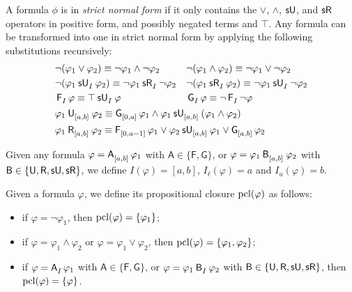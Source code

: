 \documentclass[acmsmall,screen]{acmart}
\begin{document}
A formula $\phi$ is in \emph{strict normal form} if it only contains
the $\lor$, $\land$, $\suntilop$, and $\sreleaseop$ operators in positive form,
and possibly negated terms and $\top$.
Any formula can be transformed into one in strict normal form by applying the following substitutions recursively:
\begin{align*}
&\begin{aligned}
&\neg (\varphi_1 \lor \varphi_2) \equiv \neg \varphi_1 \land \neg \varphi_2 &
&\neg (\varphi_1 \land \varphi_2) \equiv \neg \varphi_1 \lor \neg \varphi_2 \\
&\neg (\suntil{I}{\varphi_1}{\varphi_2}) \equiv \srelease{I}{\neg \varphi_1}{\neg \varphi_2} &
&\neg (\srelease{I}{\varphi_1}{\varphi_2}) \equiv \suntil{I}{\neg \varphi_1}{\neg \varphi_2} \\
&\even{I} \varphi \equiv \suntil{I}{\top}{\varphi} &
&\glob{I} \varphi \equiv \neg \even{I} \neg \varphi \\
\end{aligned} \\
&\until{[a,b]}{\varphi_1}{\varphi_2} \equiv \glob{[0,a]} \varphi_1 \land \suntil{[a,b]}{\varphi_1}{(\varphi_1 \land \varphi_2)} \\
&\release{[a,b]}{\varphi_1}{\varphi_2} \equiv \even{[0,a-1]} \varphi_1 \lor \suntil{[a,b]}{\varphi_2}{\varphi_1} \lor \glob{[a,b]} \varphi_2
\end{align*}

Given any formula $\varphi = \anyunop{[a,b]} \varphi_1$ with $\mathsf{A} \in \{\mathsf{F}, \mathsf{G}\}$,
or $\varphi = \anybinop{[a,b]}{\varphi_1}{\varphi_2}$ with $\mathsf{B} \in \{\untilop, \releaseop, \suntilop, \sreleaseop\}$,
we define $I(\varphi) = [a,b]$, $I_\ell(\varphi) = a$ and $I_u(\varphi) = b$.

Given a formula $\varphi$, we define its propositional closure $\pcl(\varphi)$ as follows:
\begin{itemize}
    \item if $\varphi = \neg \varphi_1$, then $\pcl(\varphi) = \{\varphi_1\}$;
    \item if $\varphi = \varphi_1 \land \varphi_2$ or $\varphi = \varphi_1 \lor \varphi_2$, then $\pcl(\varphi) = \{\varphi_1, \varphi_2\}$;
    \item if $\varphi = \anyunop{I} \varphi_1$ with $\mathsf{A} \in \{\mathsf{F}, \mathsf{G}\}$,
    or $\varphi = \anybinop{I}{\varphi_1}{\varphi_2}$ with $\mathsf{B} \in \{\untilop, \releaseop, \suntilop, \sreleaseop\}$,
    then $\pcl(\varphi) = \{\varphi\}$.
\end{itemize}
\end{document}
